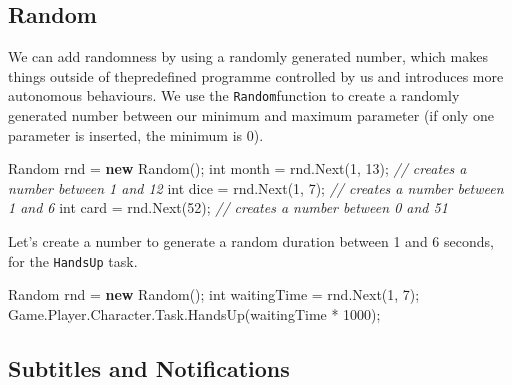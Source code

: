 \documentclass[
  openany]{book}
\newenvironment{Shaded}{\begin{snugshade}}{\end{snugshade}}
\newcommand{\CommentTok}[1]{\textcolor[rgb]{0.56,0.35,0.01}{\textit{#1}}}
\newcommand{\DataTypeTok}[1]{\textcolor[rgb]{0.13,0.29,0.53}{#1}}
\newcommand{\DecValTok}[1]{\textcolor[rgb]{0.00,0.00,0.81}{#1}}
\newcommand{\FunctionTok}[1]{\textcolor[rgb]{0.00,0.00,0.00}{#1}}
\newcommand{\KeywordTok}[1]{\textcolor[rgb]{0.13,0.29,0.53}{\textbf{#1}}}
\newcommand{\NormalTok}[1]{#1}
\begin{document}
\hypertarget{random}{%
\subsection*{Random}\label{random}}

We can add randomness by using a randomly generated number, which makes things outside of thepredefined programme controlled by us and introduces more autonomous behaviours. We use the \texttt{Random}function to create a randomly generated number between our minimum and maximum parameter (if only one parameter is inserted, the minimum is 0).

\begin{Shaded}
\begin{Highlighting}[]
\NormalTok{Random rnd = }\KeywordTok{new} \FunctionTok{Random}\NormalTok{(); }
\DataTypeTok{int}\NormalTok{ month = rnd.}\FunctionTok{Next}\NormalTok{(}\DecValTok{1}\NormalTok{, }\DecValTok{13}\NormalTok{); }\CommentTok{// creates a number between 1 and 12 }
\DataTypeTok{int}\NormalTok{ dice = rnd.}\FunctionTok{Next}\NormalTok{(}\DecValTok{1}\NormalTok{, }\DecValTok{7}\NormalTok{); }\CommentTok{// creates a number between 1 and 6 }
\DataTypeTok{int}\NormalTok{ card = rnd.}\FunctionTok{Next}\NormalTok{(}\DecValTok{52}\NormalTok{); }\CommentTok{// creates a number between 0 and 51}
\end{Highlighting}
\end{Shaded}

Let's create a number to generate a random duration between 1 and 6 seconds, for the \texttt{HandsUp} task.

\begin{Shaded}
\begin{Highlighting}[]
\NormalTok{Random rnd = }\KeywordTok{new} \FunctionTok{Random}\NormalTok{(); }
\DataTypeTok{int}\NormalTok{ waitingTime = rnd.}\FunctionTok{Next}\NormalTok{(}\DecValTok{1}\NormalTok{, }\DecValTok{7}\NormalTok{);}
\NormalTok{Game.}\FunctionTok{Player}\NormalTok{.}\FunctionTok{Character}\NormalTok{.}\FunctionTok{Task}\NormalTok{.}\FunctionTok{HandsUp}\NormalTok{(waitingTime * }\DecValTok{1000}\NormalTok{);}
\end{Highlighting}
\end{Shaded}

\hypertarget{subtitles-and-notifications}{%
\subsection*{Subtitles and Notifications}\label{subtitles-and-notifications}}
\end{document}
